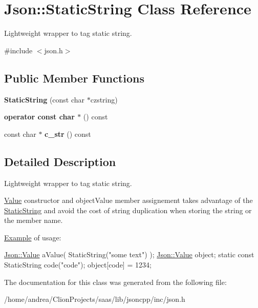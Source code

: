 \hypertarget{class_json_1_1_static_string}{}\section{Json\+:\+:Static\+String Class Reference}
\label{class_json_1_1_static_string}


Lightweight wrapper to tag static string.  




{\ttfamily \#include $<$json.\+h$>$}

\subsection*{Public Member Functions}
\begin{DoxyCompactItemize}
\item 
{\bfseries Static\+String} (const char $\ast$czstring)\hypertarget{class_json_1_1_static_string_afb6baf1ec078ce76f0b0f9b39d19437f}{}\label{class_json_1_1_static_string_afb6baf1ec078ce76f0b0f9b39d19437f}

\item 
{\bfseries operator const char $\ast$} () const \hypertarget{class_json_1_1_static_string_ac2b334d46bbea4c0227e508fc66433e9}{}\label{class_json_1_1_static_string_ac2b334d46bbea4c0227e508fc66433e9}

\item 
const char $\ast$ {\bfseries c\+\_\+str} () const \hypertarget{class_json_1_1_static_string_ab86fc6a3183adf12fdba4b370acf1754}{}\label{class_json_1_1_static_string_ab86fc6a3183adf12fdba4b370acf1754}

\end{DoxyCompactItemize}


\subsection{Detailed Description}
Lightweight wrapper to tag static string. 

\hyperlink{class_json_1_1_value}{Value} constructor and object\+Value member assignement takes advantage of the \hyperlink{class_json_1_1_static_string}{Static\+String} and avoid the cost of string duplication when storing the string or the member name.

\hyperlink{namespace_example}{Example} of usage\+: 
\begin{DoxyCode}
\hyperlink{class_json_1_1_value}{Json::Value} aValue( StaticString(\textcolor{stringliteral}{"some text"}) );
\hyperlink{class_json_1_1_value}{Json::Value} object;
\textcolor{keyword}{static} \textcolor{keyword}{const} StaticString code(\textcolor{stringliteral}{"code"});
\textcolor{keywordtype}{object}[code] = 1234;
\end{DoxyCode}
 

The documentation for this class was generated from the following file\+:\begin{DoxyCompactItemize}
\item 
/home/andrea/\+Clion\+Projects/saas/lib/jsoncpp/inc/json.\+h\end{DoxyCompactItemize}
